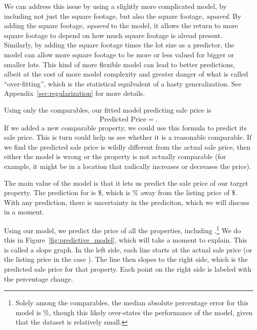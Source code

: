 \documentclass[
12pt, %
letterpaper, %
oneside, %
headinclude,footinclude, %
BCOR5mm, %
]{scrartcl}
\begin{document}
We can address this issue by using a slightly more complicated model, by including not just the square footage, but also the square footage, \emph{squared}. 
By adding the square footage, \emph{squared} to the model, it allows the return to more square footage to depend on how much square footage is alread present. 
Similarly, by adding the square footage times the lot size as a predictor, the model can allow more square footage to be more or less valued for bigger or smaller lots. 
This kind of more flexible model can lead to better predictions, albeit at the cost of more model complexity and greater danger of what is called ``over-fitting'', which is the statistical equilvalent of a hasty generalization.
See Appendix~\ref{sec:regularization} for more details. 

Using only the comparables, our fitted model predicting sale price is 
\begin{align*}
\mbox{Predicted Price} = .
\end{align*}
If we added a new comparable property, we could use this formula to predict its sale price.
This is turn could help us see whether it is a reasonable comparable. If we find the predicted sale price is wildly different from the actual sale price, then either the model is wrong or the property is not actually comparable (for example, it might be in a location that radically increases or decreases the price). 

The main value of the model is that it lets us predict the sale price of our target property.
The prediction for \PropertyName{} is \$\PropertyPricePredictionComplex{}, which is \PropertyPricePredictionComplexPercent{}\% away from the listing price of \$\PropertyPrice{}.  
With any prediction, there is uncertainty in the prediciton, which we will discuss in a moment. 

Using our model, we predict the price of all the properties, including \PropertyName{}.\footnote{
  Solely among the comparables, the median absolute percentage error for this model is \MAPE{}\%, though this likely over-states the performance of the model, given that the dataset is relatively small. 
}
We do this in Figure~\ref{fig:predictive_model}, which will take a moment to explain.
This is called a slope graph.
In the left side, each line starts at the actual sale price (or the listing price in the case \PropertyName{}).
The line then slopes to the right side, which is the predicted sale price for that property.
Each point on the right side is labeled with the percentage change. 
\end{document}
